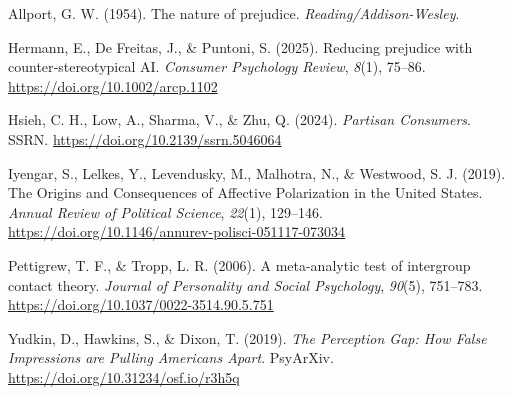 \documentclass[
  11pt,
  oneside]{article}
\newlength{\cslhangindent}
\newenvironment{CSLReferences}[2] %
 {\begin{list}{}{%
  \setlength{\itemindent}{0pt}
  \setlength{\leftmargin}{0pt}
  \setlength{\parsep}{0pt}
  \ifodd #1
   \setlength{\leftmargin}{\cslhangindent}
   \setlength{\itemindent}{-1\cslhangindent}
  \fi
  \setlength{\itemsep}{#2\baselineskip}}}
 {\end{list}}
\begin{document}
\label{refs}
\begin{CSLReferences}{1}{0}
Allport, G. W. (1954). The nature of prejudice.
\emph{Reading/Addison-Wesley}.

Hermann, E., De Freitas, J., \& Puntoni, S. (2025). Reducing prejudice
with counter‐stereotypical {AI}. \emph{Consumer Psychology Review},
\emph{8}(1), 75--86. \url{https://doi.org/10.1002/arcp.1102}

Hsieh, C. H., Low, A., Sharma, V., \& Zhu, Q. (2024). \emph{Partisan
{Consumers}}. SSRN. \url{https://doi.org/10.2139/ssrn.5046064}

Iyengar, S., Lelkes, Y., Levendusky, M., Malhotra, N., \& Westwood, S.
J. (2019). The {Origins} and {Consequences} of {Affective}
{Polarization} in the {United} {States}. \emph{Annual Review of
Political Science}, \emph{22}(1), 129--146.
\url{https://doi.org/10.1146/annurev-polisci-051117-073034}

Pettigrew, T. F., \& Tropp, L. R. (2006). A meta-analytic test of
intergroup contact theory. \emph{Journal of Personality and Social
Psychology}, \emph{90}(5), 751--783.
\url{https://doi.org/10.1037/0022-3514.90.5.751}

Yudkin, D., Hawkins, S., \& Dixon, T. (2019). \emph{The {Perception}
{Gap}: {How} {False} {Impressions} are {Pulling} {Americans} {Apart}}.
PsyArXiv. \url{https://doi.org/10.31234/osf.io/r3h5q}

\end{CSLReferences}
\end{document}
